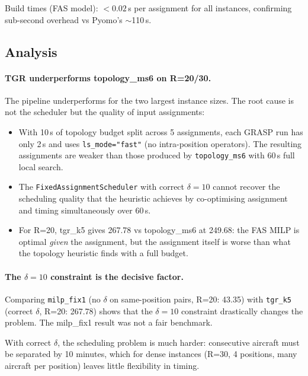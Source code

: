 \noindent Build times (FAS model): $<0.02$\,s per assignment for all instances,
confirming sub-second overhead vs Pyomo's $\sim$110\,s.

\subsection{Analysis}
\label{exp:exp02-analysis}

\paragraph{TGR underperforms topology\_ms6 on R=20/30.}

The pipeline underperforms for the two largest instance sizes.  The root cause
is not the scheduler but the quality of input assignments:

\begin{itemize}[noitemsep]
    \item With 10\,s of topology budget split across 5 assignments, each GRASP
          run has only 2\,s and uses \texttt{ls\_mode="fast"} (no intra-position
          operators).  The resulting assignments are weaker than those produced
          by \texttt{topology\_ms6} with 60\,s full local search.
    \item The \texttt{FixedAssignmentScheduler} with correct $\delta=10$ cannot
          recover the scheduling quality that the heuristic achieves by
          co-optimising assignment and timing simultaneously over 60\,s.
    \item For R=20, tgr\_k5 gives 267.78 vs topology\_ms6 at 249.68:
          the FAS MILP is optimal \emph{given} the assignment, but the assignment
          itself is worse than what the topology heuristic finds with a full budget.
\end{itemize}

\paragraph{The $\delta=10$ constraint is the decisive factor.}

Comparing \texttt{milp\_fix1} (no $\delta$ on same-position pairs, R=20: 43.35)
with \texttt{tgr\_k5} (correct $\delta$, R=20: 267.78) shows that the
$\delta=10$ constraint drastically changes the problem.  The milp\_fix1 result
was not a fair benchmark.

With correct $\delta$, the scheduling problem is much harder: consecutive
aircraft must be separated by 10 minutes, which for dense instances (R=30,
4 positions, many aircraft per position) leaves little flexibility in timing.

